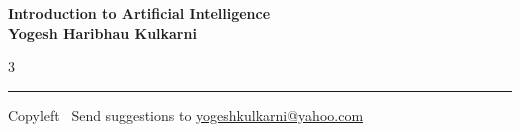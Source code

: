 \documentclass[8pt,landscape]{article}
\begin{document}
\footnotesize


\begin{center}
\Large{\textbf{Introduction to Artificial Intelligence\\ Yogesh Haribhau Kulkarni}}
\end{center}

\begin{multicols}{3}

\end{multicols}

\rule{\linewidth}{0.25pt}
\scriptsize
Copyleft \textcopyleft\  Send suggestions to
\href{http://www.yogeshkulkarni.com}{yogeshkulkarni@yahoo.com}
\end{document}
